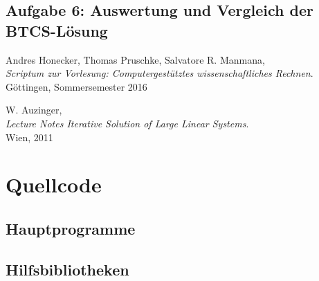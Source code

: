 \documentclass[12pt,a4paper,titlepage,headinclude,bibtotoc]{scrartcl}
\begin{document}
\subsection{Aufgabe 6: Auswertung und Vergleich der BTCS-Lösung}
\label{sec:disc_stability}

\begin{thebibliography}{9}
  Andres Honecker, Thomas Pruschke, Salvatore R. Manmana, \\
  \emph{Scriptum zur Vorlesung: Computergestütztes wissenschaftliches Rechnen}. \\
 Göttingen,
  Sommersemester 2016

  W. Auzinger, \\
  \emph{Lecture Notes Iterative Solution of Large Linear Systems}. \\
 Wien, 2011
 
 
 
 \end{thebibliography}
\clearpage

\clearpage

\section{Quellcode}
\subsection{Hauptprogramme}
\label{sec:source_main} 



\clearpage
\appendix
\subsection{Hilfsbibliotheken}
\label{sec:source_lib} 






\end{document}
